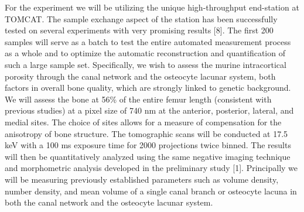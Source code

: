 For the experiment we will be utilizing the unique high-throughput end-station at TOMCAT. The sample exchange aspect of the station has been successfully tested on several experiments with very promising results [8]. The first 200 samples will serve as a batch to test the entire automated measurement process as a whole and to optimize the automatic reconstruction and quantification of such a large sample set.
Specifically, we wish to assess the murine intracortical porosity through the canal network and the osteocyte lacunar system, both factors in overall bone quality, which are strongly linked to genetic background. We will assess the bone at 56\% of the entire femur length (consistent with previous studies) at a pixel size of 740 nm at the anterior, posterior, lateral, and medial sites. The choice of sites allows for a measure of compensation for the anisotropy of bone structure. The tomographic scans will be conducted at 17.5 keV with a 100 ms exposure time for 2000 projections twice binned. The results will then be quantitatively analyzed using the same negative imaging technique and morphometric analysis developed in the preliminary study [1]. Principally we will be measuring previously established parameters such as volume density, number density, and mean volume of a single canal branch or osteocyte lacuna in both the canal network and the osteocyte lacunar system.



